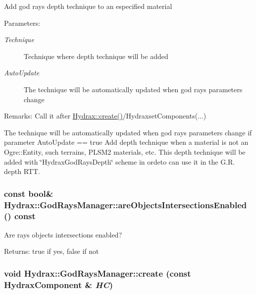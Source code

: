 \begin{CompactItemize}
Add god rays depth technique to an especified material \begin{Desc}
\item[Parameters:]
\begin{description}
\item[{\em Technique}]Technique where depth technique will be added \item[{\em AutoUpdate}]The technique will be automatically updated when god rays parameters change \end{description}
\end{Desc}
\begin{Desc}
\item[Remarks:]Call it after \hyperlink{class_hydrax_1_1_hydrax_af840e19208614533a6b344e32965ee2}{Hydrax::create()}/HydraxsetComponents(...)\end{Desc}
The technique will be automatically updated when god rays parameters change if parameter AutoUpdate == true Add depth technique when a material is not an Ogre::Entity, such terrains, PLSM2 materials, etc. This depth technique will be added with \char`\"{}HydraxGodRaysDepth\char`\"{} scheme in ordeto can use it in the G.R. depth RTT. \hypertarget{class_hydrax_1_1_god_rays_manager_e150748f9126fee118cf9262b76db170}{
\subsubsection[{areObjectsIntersectionsEnabled}]{\setlength{\rightskip}{0pt plus 5cm}const bool\& Hydrax::GodRaysManager::areObjectsIntersectionsEnabled () const}}
\label{class_hydrax_1_1_god_rays_manager_e150748f9126fee118cf9262b76db170}


Are rays objects intersections enabled? \begin{Desc}
\item[Returns:]true if yes, false if not \end{Desc}
\hypertarget{class_hydrax_1_1_god_rays_manager_d6e8cfa4b9bde36b668d04ae3cfe8d00}{
\subsubsection[{create}]{\setlength{\rightskip}{0pt plus 5cm}void Hydrax::GodRaysManager::create (const {\bf HydraxComponent} \& {\em HC})}}
\label{class_hydrax_1_1_god_rays_manager_d6e8cfa4b9bde36b668d04ae3cfe8d00}



\end{CompactItemize}
